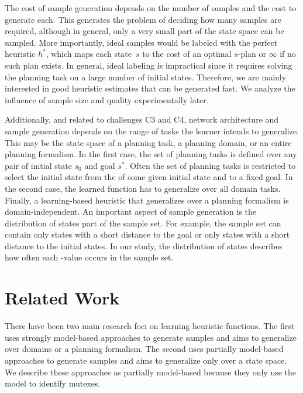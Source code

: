 The cost of sample generation depends on the number of samples and the cost to generate each. This generates the problem of deciding how many samples are required, although in general, only a very small part of the state space can be sampled. More importantly, ideal samples would be labeled with the perfect heuristic $h^*$, which maps each state~$s$ to the cost of an optimal $s$-plan or $\infty$ if no such plan exists. 
In general, ideal labeling is impractical since it requires solving the planning task on a large number of initial states. Therefore, we are mainly interested in good heuristic estimates that can be generated fast. We analyze the influence of sample size and quality experimentally later.

Additionally, and related to challenges C3 and C4, network architecture and sample generation depends on the range of tasks the learner intends to generalize. This may be the state space of a planning task, a planning domain, or an entire planning formalism. In the first case, the set of planning tasks is defined over any pair of initial state $s_0$ and goal $s^*$. Often the set of planning tasks is restricted to select the initial state from the \fssp of some given initial state and to a fixed goal. In the second case, the learned function has to generalize over all domain tasks. Finally, a learning-based heuristic that generalizes over a planning formalism is domain-independent. An important aspect of sample generation is the distribution of states part of the sample set. For example, the sample set can contain only states with a short distance to the goal or only states with a short distance to the initial states. In our study, the distribution of states describes how often each \hstar-value occurs in the sample set.
 
\section{Related Work}
\label{sec:related}

There have been two main research foci on learning heuristic functions. The first uses strongly model-based approaches to generate samples and aims to generalize over domains or a planning formalism. The second uses partially model-based approaches to generate samples and aims to generalize only over a state space. We describe these approaches as partially model-based because they only use the model to identify mutexes.

